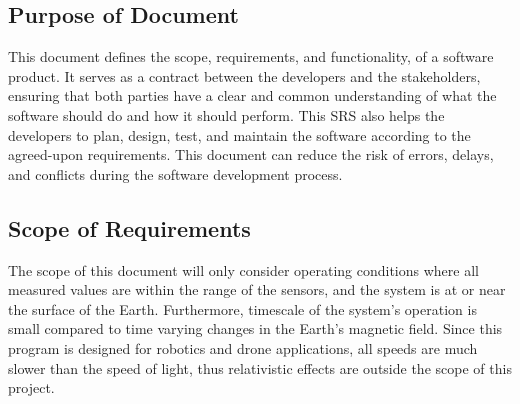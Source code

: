 \documentclass[12pt]{article}
\begin{document}


\subsection{Purpose of Document}


This document defines the scope, requirements, and functionality, of a software product. It serves
as a contract between the developers and the stakeholders, ensuring that both parties have a clear
and common understanding of what the software should do and how it should perform. This SRS also
helps the developers to plan, design, test, and maintain the software according to the agreed-upon
requirements. This document can reduce the risk of errors, delays, and conflicts during the software
development process. \cite{purpose}

\subsection{Scope of Requirements}

The scope of this document will only consider operating conditions where all measured values are
within the range of the sensors, and the system is at or near the surface of the Earth. Furthermore,
timescale of the system's operation is small compared to time varying changes in the Earth's
magnetic field. Since this program is designed for robotics and drone applications, all speeds are
much slower than the speed of light, thus relativistic effects are outside the scope of this
project.
\end{document}
